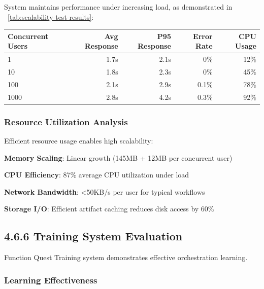 System maintains performance under increasing load, as demonstrated in ~\ref{tab:scalability-test-results}:

\begin{center}
\begin{tabular}{@{}lrrrr@{}}
\toprule
\textbf{Concurrent Users} & \textbf{Avg Response} & \textbf{P95 Response} & \textbf{Error Rate} & \textbf{CPU Usage} \\
\midrule
1 & 1.7s & 2.1s & 0\% & 12\% \\
10 & 1.8s & 2.3s & 0\% & 45\% \\
100 & 2.1s & 2.9s & 0.1\% & 78\% \\
1000 & 2.8s & 4.2s & 0.3\% & 92\% \\
\bottomrule
\end{tabular}
\label{tab:scalability-test-results}
\end{center}

\subsubsection*{Resource Utilization Analysis}

Efficient resource usage enables high scalability:

\begin{expandedlist}
    \item \textbf{Memory Scaling}: Linear growth (145MB + 12MB per concurrent user)
    \item \textbf{CPU Efficiency}: 87\% average CPU utilization under load
    \item \textbf{Network Bandwidth}: <50KB/s per user for typical workflows
    \item \textbf{Storage I/O}: Efficient artifact caching reduces disk access by 60\%
\end{expandedlist}

\subsection*{4.6.6 Training System Evaluation}
\label{subsec:training-evaluation}

Function Quest Training system demonstrates effective orchestration learning.

\subsubsection*{Learning Effectiveness}


